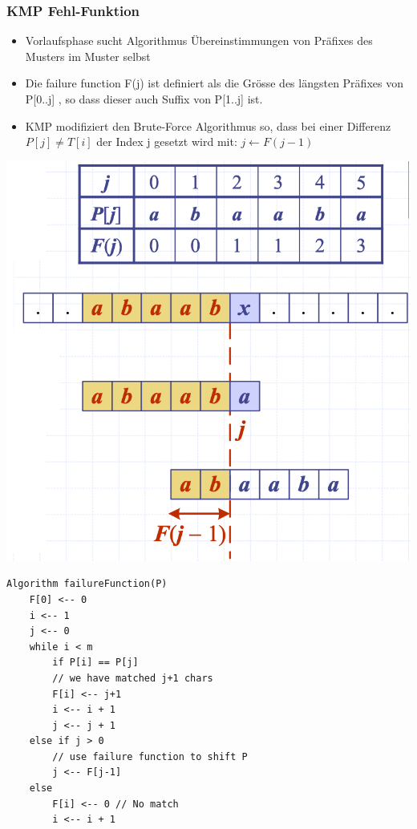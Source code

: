 \subsubsection{KMP Fehl-Funktion}
\begin{itemize}
    \item Vorlaufsphase sucht Algorithmus Übereinstimmungen von Präfixes des Musters im Muster selbst
    \item Die failure function F(j) ist definiert als die Grösse des längsten Präfixes von P[0..j] , so dass dieser auch Suffix von P[1..j] ist.
    \item KMP modifiziert den Brute-Force Algorithmus so, dass bei einer Differenz $P[j] \neq T[i]$ der Index j gesetzt wird mit: $ j \leftarrow F(j-1)$
\end{itemize}
\vspace{-8pt}
\begin{center}
    \includegraphics[scale=.2]{graphic/08 PatternMatching/KMP Fehl.png}
\end{center}
\vspace{-8pt}
\begin{lstlisting}
Algorithm failureFunction(P)
    F[0] <-- 0
    i <-- 1
    j <-- 0
    while i < m
        if P[i] == P[j]
        // we have matched j+1 chars
        F[i] <-- j+1
        i <-- i + 1
        j <-- j + 1
    else if j > 0
        // use failure function to shift P
        j <-- F[j-1]
    else
        F[i] <-- 0 // No match
        i <-- i + 1
\end{lstlisting}
